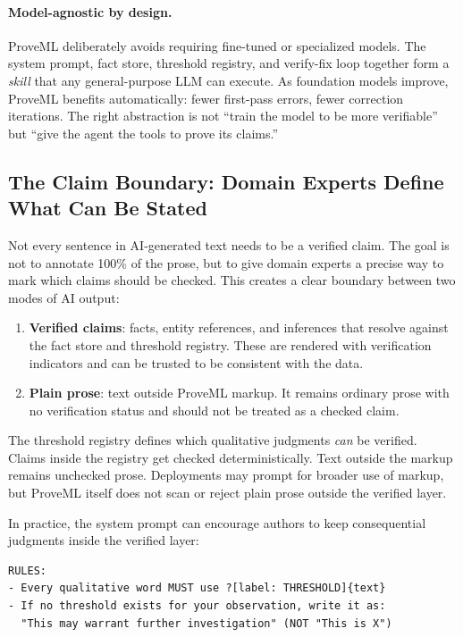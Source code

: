 \documentclass[11pt,a4paper]{article}
\begin{document}
\paragraph{Model-agnostic by design.} ProveML deliberately avoids requiring fine-tuned or specialized models. The system prompt, fact store, threshold registry, and verify-fix loop together form a \textit{skill} that any general-purpose LLM can execute. As foundation models improve, ProveML benefits automatically: fewer first-pass errors, fewer correction iterations. The right abstraction is not ``train the model to be more verifiable'' but ``give the agent the tools to prove its claims.''

\subsection{The Claim Boundary: Domain Experts Define What Can Be Stated}
\label{sec:boundary}

Not every sentence in AI-generated text needs to be a verified claim. The goal is not to annotate 100\% of the prose, but to give domain experts a precise way to mark which claims should be checked. This creates a clear boundary between two modes of AI output:

\begin{enumerate}
    \item \textbf{Verified claims}: facts, entity references, and inferences that resolve against the fact store and threshold registry. These are rendered with verification indicators and can be trusted to be consistent with the data.
    \item \textbf{Plain prose}: text outside ProveML markup. It remains ordinary prose with no verification status and should not be treated as a checked claim.
\end{enumerate}

The threshold registry defines which qualitative judgments \textit{can} be verified. Claims inside the registry get checked deterministically. Text outside the markup remains unchecked prose. Deployments may prompt for broader use of markup, but ProveML itself does not scan or reject plain prose outside the verified layer.

In practice, the system prompt can encourage authors to keep consequential judgments inside the verified layer:

\begin{lstlisting}
RULES:
- Every qualitative word MUST use ?[label: THRESHOLD]{text}
- If no threshold exists for your observation, write it as:
  "This may warrant further investigation" (NOT "This is X")
\end{lstlisting}
\end{document}
